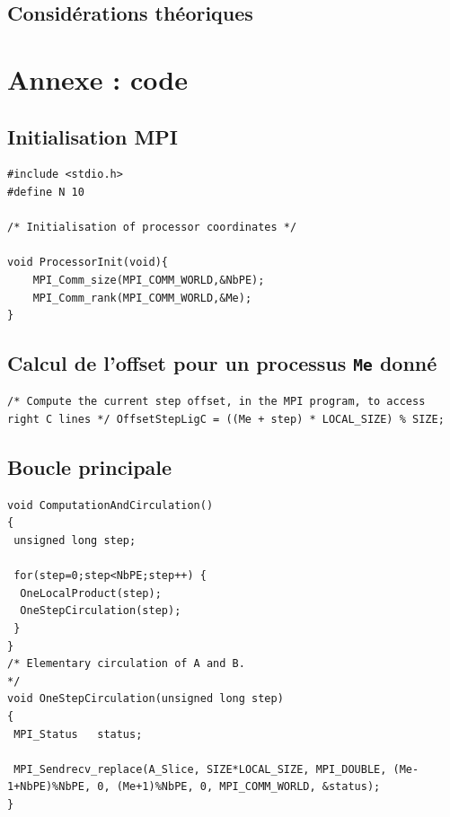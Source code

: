 \documentclass[	DIV=calc,%
							paper=a4,%
							fontsize=11pt%
							]{scrartcl}	 					%
\begin{document}
\subsection{Considérations théoriques}
 


\section{Annexe : code}

\subsection*{Initialisation MPI}
\begin{lstlisting}
#include <stdio.h>
#define N 10

/* Initialisation of processor coordinates */

void ProcessorInit(void){
	MPI_Comm_size(MPI_COMM_WORLD,&NbPE);
  	MPI_Comm_rank(MPI_COMM_WORLD,&Me);
}
\end{lstlisting}


\subsection*{Calcul de l'offset pour un processus {\texttt{Me} donné}}
\begin{lstlisting}
/* Compute the current step offset, in the MPI program, to access right C lines */ OffsetStepLigC = ((Me + step) * LOCAL_SIZE) % SIZE; 
\end{lstlisting}

\subsection*{Boucle principale}
\begin{lstlisting}
void ComputationAndCirculation()
{
 unsigned long step;
 
 for(step=0;step<NbPE;step++) { 
  OneLocalProduct(step);
  OneStepCirculation(step);
 }
}
/* Elementary circulation of A and B.                                            */
void OneStepCirculation(unsigned long step)
{
 MPI_Status   status;

 MPI_Sendrecv_replace(A_Slice, SIZE*LOCAL_SIZE, MPI_DOUBLE, (Me-1+NbPE)%NbPE, 0, (Me+1)%NbPE, 0, MPI_COMM_WORLD, &status);
}


\end{lstlisting} 
\end{document}
